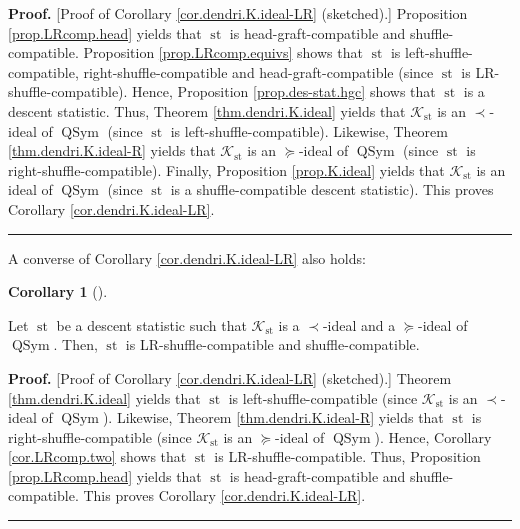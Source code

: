 \documentclass[numbers=enddot,12pt,final,onecolumn,notitlepage]{scrartcl}%
\theoremstyle{definition}
\newtheorem{coro}[theo]{Corollary}
\newenvironment{corollary}[1][]
{\begin{coro}[#1]\begin{leftbar}}
{\end{leftbar}\end{coro}}
\newenvironment{proof}[1][Proof]{\noindent\textbf{#1.} }{\ \rule{0.5em}{0.5em}}
\newenvironment{verlong}{}{}
\begin{document}
\begin{verlong}
\begin{proof}
[Proof of Corollary \ref{cor.dendri.K.ideal-LR} (sketched).] Proposition
\ref{prop.LRcomp.head} yields that $\operatorname*{st}$ is
head-graft-compatible and shuffle-compatible. Proposition
\ref{prop.LRcomp.equivs} shows that $\operatorname*{st}$ is
left-shuffle-compatible, right-shuffle-compatible and head-graft-compatible
(since $\operatorname*{st}$ is LR-shuffle-compatible). Hence, Proposition
\ref{prop.des-stat.hgc} shows that $\operatorname*{st}$ is a descent
statistic. Thus, Theorem \ref{thm.dendri.K.ideal} yields that $\mathcal{K}%
_{\operatorname*{st}}$ is an $\left.  \prec\right.  $-ideal of
$\operatorname*{QSym}$ (since $\operatorname*{st}$ is
left-shuffle-compatible). Likewise, Theorem \ref{thm.dendri.K.ideal-R} yields
that $\mathcal{K}_{\operatorname*{st}}$ is an $\left.  \succeq\right.  $-ideal
of $\operatorname*{QSym}$ (since $\operatorname*{st}$ is
right-shuffle-compatible). Finally, Proposition \ref{prop.K.ideal} yields that
$\mathcal{K}_{\operatorname*{st}}$ is an ideal of $\operatorname*{QSym}$
(since $\operatorname*{st}$ is a shuffle-compatible descent statistic). This
proves Corollary \ref{cor.dendri.K.ideal-LR}.
\end{proof}

A converse of Corollary \ref{cor.dendri.K.ideal-LR} also holds:

\begin{corollary}
\label{cor.dendri.K.ideal-LRi}Let $\operatorname*{st}$ be a descent statistic
such that $\mathcal{K}_{\operatorname*{st}}$ is a $\left.  \prec\right.
$-ideal and a $\left.  \succeq\right.  $-ideal of $\operatorname*{QSym}$.
Then, $\operatorname*{st}$ is LR-shuffle-compatible and shuffle-compatible.
\end{corollary}

\begin{proof}
[Proof of Corollary \ref{cor.dendri.K.ideal-LR} (sketched).] Theorem
\ref{thm.dendri.K.ideal} yields that $\operatorname*{st}$ is
left-shuffle-compatible (since $\mathcal{K}_{\operatorname*{st}}$ is an
$\left.  \prec\right.  $-ideal of $\operatorname*{QSym}$). Likewise, Theorem
\ref{thm.dendri.K.ideal-R} yields that $\operatorname*{st}$ is
right-shuffle-compatible (since $\mathcal{K}_{\operatorname*{st}}$ is an
$\left.  \succeq\right.  $-ideal of $\operatorname*{QSym}$). Hence, Corollary
\ref{cor.LRcomp.two} shows that $\operatorname*{st}$ is LR-shuffle-compatible.
Thus, Proposition \ref{prop.LRcomp.head} yields that $\operatorname*{st}$ is
head-graft-compatible and shuffle-compatible. This proves Corollary
\ref{cor.dendri.K.ideal-LR}.
\end{proof}


\end{verlong}
\end{document}
